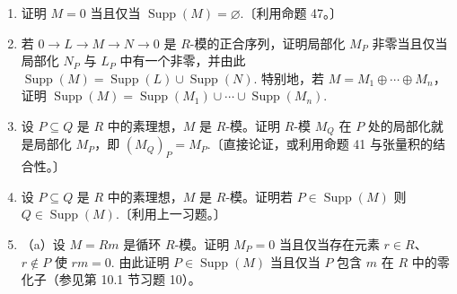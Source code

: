 \begin{enumerate}
（b）若 \(P_{i-1}\) 在 \(k[x_1, \ldots, x_i]\) 中生成的理想等于 \(P_i\)，证明 \(V_i \cong V_{i-1} \times \mathbb{A}^1\)，并由此 \(\dim V_i = \dim V_{i-1}+1\).

（c）若 \(P_{i-1}\) 在 \(k[x_1, \ldots, x_i]\) 中生成的理想真包含在 \(P_i\) 中，证明 \(\dim V_i = \dim V_{i-1}\).

（d）证明 \(\dim V\) 等于使 \(P_{i-1}\) 在 \(k[x_1, \ldots, x_i]\) 中生成的理想等于 \(P_i\) 的 \(i \in \{1, 2, \ldots, n\}\) 的个数。由此证明：若 \(G\) 是 \(P\) 关于字典序 \(x_n > \cdots > x_1\) 的约化 Gröbner 基，\(G_i = G \cap k[x_1, \ldots, x_i]\)（取 \(G_0 = 0\)），而 \(N\) 是满足 \(G_i \neq G_{i-1}\) 的 \(i\)（\(1 \leq i \leq n\)）的个数，则 \(\dim V = n-N\).

\noindent 下面十一个习题引入 \(R\)-模 \(M\) 的\textbf{支集}的概念以及它与 \(M\) 的相伴素理想的关系。另见第 1 节习题 29--35 与第 5 节习题 25--30.

\noindent\textbf{定义。} 若 \(M\) 是 \(R\)-模，则使局部化 \(M_P\) 非零的 \(R\) 的素理想 \(P\) 之集称为 \(M\) 的\textbf{支集}，记作 \(\operatorname{Supp}(M)\).

\item 证明 \(M = 0\) 当且仅当 \(\operatorname{Supp}(M) = \varnothing\).〔利用命题 47。〕

\item 若 \(0 \to L \to M \to N \to 0\) 是 \(R\)-模的正合序列，证明局部化 \(M_P\) 非零当且仅当局部化 \(N_P\) 与 \(L_P\) 中有一个非零，并由此 \(\operatorname{Supp}(M) = \operatorname{Supp}(L) \cup \operatorname{Supp}(N)\). 特别地，若 \(M = M_1 \oplus \cdots \oplus M_n\)，证明 \(\operatorname{Supp}(M) = \operatorname{Supp}(M_1) \cup \cdots \cup \operatorname{Supp}(M_n)\).

\item 设 \(P \subseteq Q\) 是 \(R\) 中的素理想，\(M\) 是 \(R\)-模。证明 \(R\)-模 \(M_Q\) 在 \(P\) 处的局部化就是局部化 \(M_P\)，即 \((M_Q)_P = M_P\).〔直接论证，或利用命题 41 与张量积的结合性。〕

\item 设 \(P \subseteq Q\) 是 \(R\) 中的素理想，\(M\) 是 \(R\)-模。证明若 \(P \in \operatorname{Supp}(M)\) 则 \(Q \in \operatorname{Supp}(M)\).〔利用上一习题。〕

\item （a）设 \(M = Rm\) 是循环 \(R\)-模。证明 \(M_P = 0\) 当且仅当存在元素 \(r \in R\)、\(r \notin P\) 使 \(rm = 0\). 由此证明 \(P \in \operatorname{Supp}(M)\) 当且仅当 \(P\) 包含 \(m\) 在 \(R\) 中的零化子（参见第 10.1 节习题 10）。


\end{enumerate}
